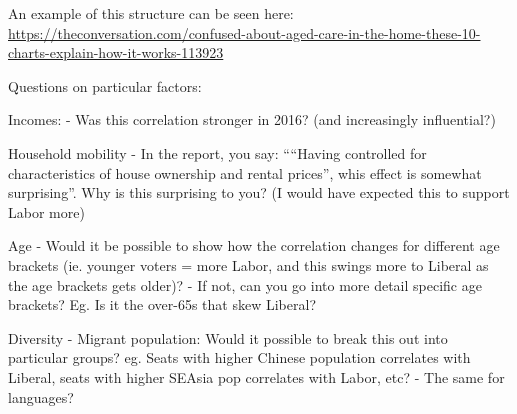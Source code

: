 \documentclass[11pt,a4paper,]{article}
\begin{document}
An example of this structure can be seen here:
\url{https://theconversation.com/confused-about-aged-care-in-the-home-these-10-charts-explain-how-it-works-113923}

Questions on particular factors:

Incomes:
- Was this correlation stronger in 2016? (and increasingly influential?)

Household mobility
- In the report, you say: ````Having controlled for characteristics of house ownership and rental prices'', whis effect is somewhat surprising''. Why is this surprising to you? (I would have expected this to support Labor more)

Age
- Would it be possible to show how the correlation changes for different age brackets (ie. younger voters = more Labor, and this swings more to Liberal as the age brackets gets older)?
- If not, can you go into more detail specific age brackets? Eg. Is it the over-65s that skew Liberal?

Diversity
- Migrant population: Would it possible to break this out into particular groups? eg. Seats with higher Chinese population correlates with Liberal, seats with higher SEAsia pop correlates with Labor, etc?
- The same for languages?

\printbibliography
\end{document}
